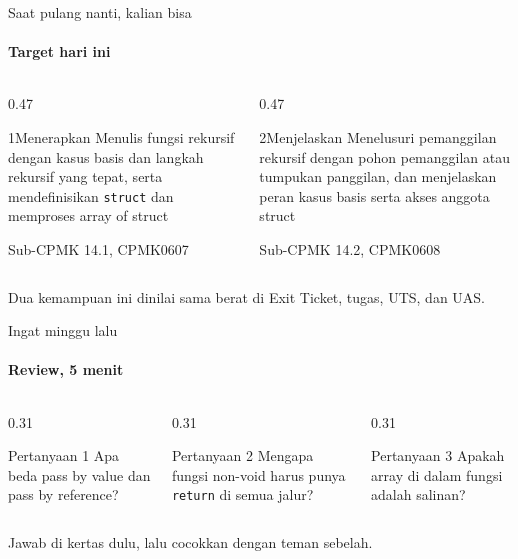 \documentclass[t]{beamer}
\begin{document}
\begin{frame}{Saat pulang nanti, kalian bisa}
\framesubtitle{Target hari ini}
\begin{columns}[T]
\begin{column}{0.47\textwidth}
\begin{Langkah}{1}{Menerapkan}
Menulis fungsi rekursif dengan kasus basis dan langkah rekursif yang tepat, serta mendefinisikan \texttt{struct} dan memproses array of struct

{\footnotesize\color{ITERAInkMuted}Sub-CPMK 14.1, CPMK0607}
\end{Langkah}
\end{column}
\begin{column}{0.47\textwidth}
\begin{Langkah}{2}{Menjelaskan}
Menelusuri pemanggilan rekursif dengan pohon pemanggilan atau tumpukan panggilan, dan menjelaskan peran kasus basis serta akses anggota struct

{\footnotesize\color{ITERAInkMuted}Sub-CPMK 14.2, CPMK0608}
\end{Langkah}
\end{column}
\end{columns}
\vspace{8pt}
\begin{Catatan}
Dua kemampuan ini dinilai sama berat di Exit Ticket, tugas, UTS, dan UAS.
\end{Catatan}
\end{frame}

\begin{frame}{Ingat minggu lalu}
\framesubtitle{Review, 5 menit}
\begin{columns}[T]
\begin{column}{0.31\textwidth}
\begin{BlokGelap}{Pertanyaan 1}
Apa beda pass by value dan pass by reference?
\end{BlokGelap}
\end{column}
\begin{column}{0.31\textwidth}
\begin{BlokGelap}{Pertanyaan 2}
Mengapa fungsi non-void harus punya \texttt{return} di semua jalur?
\end{BlokGelap}
\end{column}
\begin{column}{0.31\textwidth}
\begin{BlokGelap}{Pertanyaan 3}
Apakah array di dalam fungsi adalah salinan?
\end{BlokGelap}
\end{column}
\end{columns}
\vspace{8pt}
Jawab di kertas dulu, lalu cocokkan dengan teman sebelah.
\end{frame}
\end{document}
